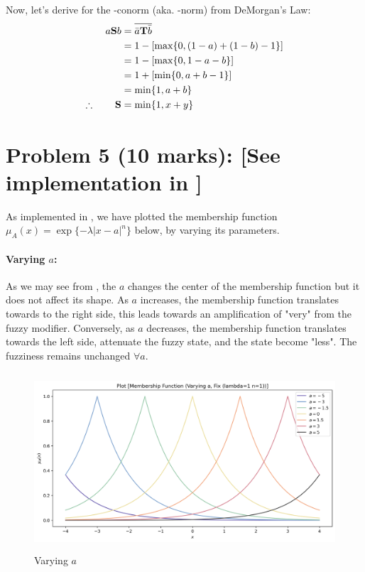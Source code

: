 \documentclass{tron}
\begin{document}
Now, let's derive for the \T-conorm (aka. \Snorm-norm) from DeMorgan's Law:
\begin{align}
	a\textbf{S} b 	& = \overline{\bar a \textbf{T} \bar b} \\
				& = 1 - \left[  \max \{0, (1-a) + (1-b) - 1\}  \right] \\
				& = 1 -\left[  \max \{0, 1 - a - b \}  \right] \\
				& = 1 +\left[  \min \{0, a + b - 1 \}  \right] \\
				& = \min \{1, a + b \} \\
	\therefore \qquad \textbf{S} & = \min \{1, x + y \}
\end{align}

\clearpage
\section{Problem 5 (10 marks): [See implementation in ]}
As implemented in , we have plotted the membership function $\mu_A(x) = \exp \{ -\lambda |x-a|^n\}$ below, by varying its parameters.

\paragraph{Varying $a$:}
As we may see from , the $a$ changes the center of the membership function but it does not affect its shape. As $a$ increases, the membership function translates towards to the right side, this leads towards an amplification of "very" from the fuzzy modifier. Conversely, as $a$ decreases, the membership function translates towards the left side, attenuate the fuzzy state, and the state become "less". The fuzziness remains unchanged $\forall a$.
\begin{figure}[H]
	\centering
	\includegraphics[height=250px]{../src_code/output/P5/plot_Membership Function (Varying a, Fix (lambda=1 n=1))}
	\caption{Varying $a$}
	\label{fig:p5:a}
\end{figure}
\end{document}
